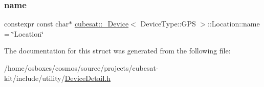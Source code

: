 \subsubsection{\texorpdfstring{name}{name}}
{\footnotesize\ttfamily constexpr const char$\ast$ \hyperlink{structcubesat_1_1__Device}{cubesat\+::\+\_\+\+Device}$<$ Device\+Type\+::\+G\+PS $>$\+::Location\+::name = \char`\"{}Location\char`\"{}\hspace{0.3cm}{\ttfamily [static]}}



The documentation for this struct was generated from the following file\+:\begin{DoxyCompactItemize}
\item 
/home/osboxes/cosmos/source/projects/cubesat-\/kit/include/utility/\hyperlink{DeviceDetail_8h}{Device\+Detail.\+h}\end{DoxyCompactItemize}
